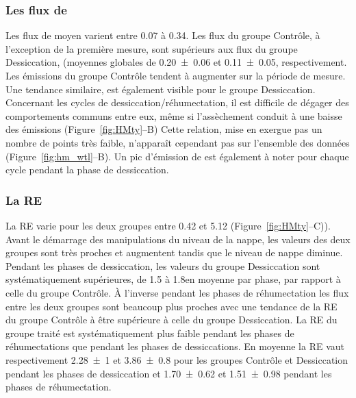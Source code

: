 \subsubsection{Les flux de \chh}

Les flux de \chh moyen varient entre \num{0.07} à \SI{0.34}{\uml}.
Les flux du groupe Contrôle, à l'exception de la première mesure, sont supérieurs aux flux du groupe Dessiccation, (moyennes globales de \num{0.20(006)} et \SI{0.11(005)}{\uml}, respectivement.
Les émissions du groupe Contrôle tendent à augmenter sur la période de mesure.
Une tendance similaire, est également visible pour le groupe Dessiccation.
Concernant les cycles de dessiccation/réhumectation, il est difficile de dégager des comportements communs entre eux, même si l'assèchement conduit à une baisse des émissions (Figure~\ref{fig:HMty}--B)
Cette relation, mise en exergue pas un nombre de points très faible, n’apparaît cependant pas sur l'ensemble des données (Figure~\ref{fig:hm_wtl}--B).
Un pic d'émission de \chh est également à noter pour chaque cycle pendant la phase de dessiccation.

\subsubsection{La RE}

La RE varie pour les deux groupes entre \num{0.42} et \SI{5.12}{\uml} (Figure~\ref{fig:HMty}--C)).
Avant le démarrage des manipulations du niveau de la nappe, les valeurs des deux groupes sont très proches et augmentent tandis que le niveau de nappe diminue.
Pendant les phases de dessiccation, les valeurs du groupe Dessiccation sont systématiquement supérieures, de \num{1.5} à \SI{1.8}{\uml}en moyenne par phase, par rapport à celle du groupe Contrôle.
À l'inverse pendant les phases de réhumectation les flux entre les deux groupes sont beaucoup plus proches avec une tendance de la RE du groupe Contrôle à être supérieure à celle du groupe Dessiccation.
La RE du groupe traité est systématiquement plus faible pendant les phases de réhumectations que pendant les phases de dessiccations.
En moyenne la RE vaut respectivement \num{2.28(100)} et \SI{3.86(080)}{\uml} pour les groupes Contrôle et Dessiccation pendant les phases de dessiccation et \num{1.70(062)} et \SI{1.51(098)}{\uml} pendant les phases de réhumectation.

